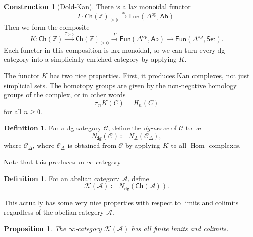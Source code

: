 \documentclass[10pt, oneside]{memoir}
\newtheorem{prop}[thm]{Proposition}
\theoremstyle{definition}
\newtheorem{defn}[thm]{Definition}
\newtheorem{con}[thm]{Construction}
\theoremstyle{remark}
\theoremstyle{plain}
\theoremstyle{definition}
\theoremstyle{remark}
\newcommand{\Z}{\mathbb{Z}}
\newcommand{\mc}[1]{\mathcal{#1}}
\newcommand{\ms}[1]{\mathsf{#1}}
\newcommand{\1}{\mathbf{1}}
\newcommand{\2}{\mathbf{2}}
\newcommand{\3}{\mathbf{3}}
\DeclareMathOperator{\Hom}{Hom}
\DeclareMathOperator{\op}{op}
\begin{document}
\begin{con}[Dold-Kan]
    There is a lax monoidal functor
    \[ \Gamma \colon \ms{Ch}(\Z)_{\geq 0} \xrightarrow{\simeq} \ms{Fun}(\Delta^{\op}, \ms{Ab}). \]
    Then we form the composite
    \[ K \colon \ms{Ch}(\Z) \xrightarrow{\tau_{\geq 0}} \ms{Ch}(\Z)_{\geq 0} \xrightarrow{\Gamma} \ms{Fun}(\Delta^{\op}, \ms{Ab}) \to \ms{Fun}(\Delta^{\op}, \ms{Set}). \]
    Each functor in this composition is lax monoidal, so we can turn every dg category into a simplicially enriched category by applying $K$.
\end{con}

The functor $K$ has two nice properties. First, it produces Kan complexes, not just simplicial sets. The homotopy groups are given by the non-negative homology groups of the complex, or in other words
\[ \pi_n K(C) = H_n(C) \]
for all $n \geq 0$.

\begin{defn}
    For a dg category $\mc{C}$, define the \textit{dg-nerve} of $\mc{C}$ to be
    \[ N_{\ms{dg}}(\mc{C}) \coloneqq N_{\Delta} (\mc{C}_{\Delta}), \]
    where $\mc{C}_{\Delta}$, where $\mc{C}_{\Delta}$ is obtained from $\mc{C}$ by applying $K$ to all $\Hom$ complexes.
\end{defn}
Note that this produces an $\infty$-category.

\begin{defn}
    For an abelian category $\mc{A}$, define
    \[ \mc{K}(\mc{A}) \coloneqq N_{\ms{dg}}(\ms{Ch}(\mc{A})). \]
\end{defn}

This actually has some very nice properties with respect to limits and colimits regardless of the abelian category $\mc{A}$.

\begin{prop}
    The $\infty$-category $\mc{K}(\mc{A})$ has all finite limits and colimits.
\end{prop}
\end{document}
